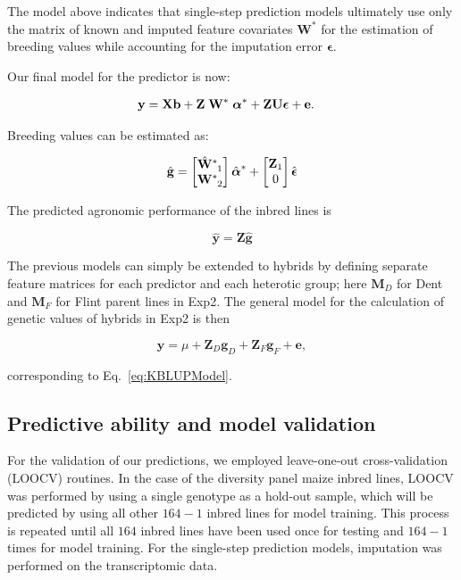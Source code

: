\documentclass[12pt,titlepage]{article}
\begin{document}
The model above indicates that single-step prediction models ultimately use
only the matrix of known and imputed feature covariates $\mathbf{W}^{*}$ for the
estimation of breeding values while accounting for the imputation error
$\boldsymbol{\epsilon}$.

Our final model for the predictor is now:

\begin{align} \label{eq:final-model}
\mathbf{y} &= \mathbf{Xb} +
\mathbf{Z} \;
\tensor[]{\mathbf{W}}{^{*}} \;
\tensor[]{\boldsymbol{\alpha}}{^{*}} +
\mathbf{Z}\mathbf{U} \boldsymbol{\epsilon} +
\mathbf{e}.
\end{align}

Breeding values can be estimated as:

\begin{equation} \label{eq:breeding-values}
\hat{\mathbf{g}} =
 \begin{bmatrix}
  \tensor[]{\hat{\mathbf{W}}}{^{*}_{1}} \\
  \tensor[]{\mathbf{W}}{^{*}_{2}}
 \end{bmatrix}
 \tensor[]{\hat{\boldsymbol{\alpha}}}{^{*}}
 +
 \begin{bmatrix}
  \mathbf{Z}_1 \\
  0
 \end{bmatrix}
 \hat{\boldsymbol{\epsilon}}
\end{equation}


The predicted agronomic performance of the inbred lines is

\begin{equation} \label{eq:inbred-predicted-performance}
\hat{\mathbf{y}} = \mathbf{Z}\mathbf{\hat{g}} 
\end{equation}

The previous models can simply be extended to hybrids by defining separate
feature matrices for each predictor and each heterotic group; here
$\mathbf{M}_{D}$ for Dent and $\mathbf{M}_{F}$ for Flint parent lines in Exp2.
The general model for the calculation of genetic values of hybrids in Exp2 is
then

\begin{equation} \label{eq:hybrid-genetic-value-model}
  \mathbf{y} = \mu + \mathbf{Z}_{D} \mathbf{g}_{D} +
  \mathbf{Z}_{F} \mathbf{g}_{F} +
  \mathbf{e},
\end{equation}

corresponding to Eq.~\ref{eq:KBLUPModel}.


\subsection{Predictive ability and model validation}
For the validation of our predictions, we employed leave-one-out
cross-validation (LOOCV) routines.
In the case of the diversity panel maize inbred lines, LOOCV was performed by 
using a single genotype as a hold-out sample, which will be predicted by using
all other $164 - 1$ inbred lines for model training.
This process is repeated until all $164$ inbred lines have been used once for
testing and $164 - 1$ times for model training.
For the single-step prediction models, imputation was performed on the
transcriptomic data.
\end{document}
